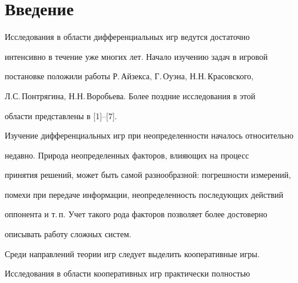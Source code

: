  


\date{} 




\pagestyle{plain} %


 




\maketitle 


\label{begin} 


 


 


\section*{Введение} 


 


Исследования в области дифференциальных игр ведутся достаточно 


интенсивно в течение уже многих лет. Начало изучению задач в игровой 


постановке положили работы Р.\,Айзекса, Г.\,Оуэна, Н.Н.\,Красовского, 


Л.С.\,Понтрягина, Н.Н.\,Воробьева. Более поздние исследования в этой 


области представлены в [1]--[7]. 


 


Изучение дифференциальных игр при неопределенности началось относительно 


недавно. Природа неопределенных факторов, влияющих на процесс 


принятия решений, может быть самой разнообразной: погрешности измерений, 


помехи при передаче информации, неопределенность последующих действий 


оппонента и т.\,п. Учет такого рода факторов позволяет более достоверно 


описывать работу сложных систем. 


 


Среди направлений теории игр следует выделить кооперативные игры. 


Исследования в области кооперативных игр практически полностью


